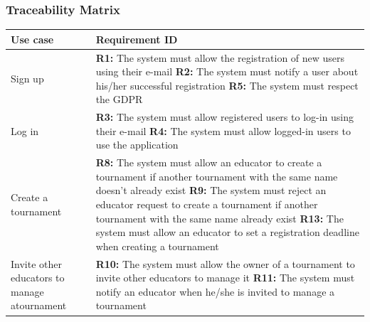\documentclass[../RASD.tex]{subfiles}
\begin{document}
    \subsubsection*{Traceability Matrix}
    \begin{table}[h!]
        \begin{center}
            \begin{tabular}{|m{10em}|m{30em}|}
            \hline
            \rowcolor{UCMappingFirstRow}
            \textbf{Use case} & \textbf{Requirement ID}\\
            \hline
            Sign up \cellcolor{UCMappingFirstColumn}& \textbf{R1:} The system must allow the registration of new users using their e-mail\cellcolor{UCMappingSecondColumn}\newline
            \textbf{R2:} The system must notify a user about his/her successful registration\cellcolor{UCMappingSecondColumn}\newline
            \textbf{R5:} The system must respect the GDPR\cellcolor{UCMappingSecondColumn}\\
            \hline
            Log in \cellcolor{UCMappingFirstColumn}& \textbf{R3:} The system must allow registered users to log-in using their e-mail\cellcolor{UCMappingSecondColumn}\newline
            \textbf{R4:} The system must allow logged-in users to use the application\cellcolor{UCMappingSecondColumn}\\
            \hline
            Create a tournament \cellcolor{UCMappingFirstColumn}& \textbf{R8:} The system must allow an educator to create a tournament if another tournament with the same name doesn't already exist\cellcolor{UCMappingSecondColumn}\newline
            \textbf{R9:} The system must reject an educator request to create a tournament if another
            tournament with the same name already exist\cellcolor{UCMappingSecondColumn}\newline
            \textbf{R13:} The system must allow an educator to set a registration deadline when creating
            a tournament\cellcolor{UCMappingSecondColumn}\\
            \hline
            Invite other educators to manage a\newline tournament \cellcolor{UCMappingFirstColumn}& \textbf{R10:} The system must allow the owner of a tournament to invite other educators to manage it\cellcolor{UCMappingSecondColumn}\newline
            \textbf{R11:} The system must notify an educator when he/she is invited to manage a tournament\cellcolor{UCMappingSecondColumn}\newline

\end{tabular}
\end{center}
\end{table}
\end{document}
